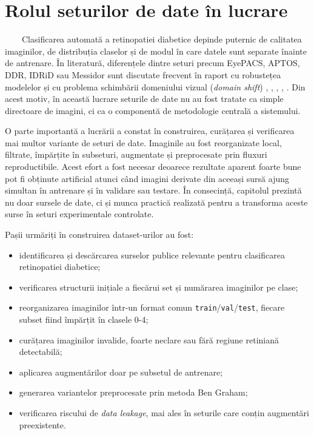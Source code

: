 \documentclass[12pt, a4paper, twoside, romanian]{teza-upb}
\begin{document}
\section{Rolul seturilor de date în lucrare}

\ \ \ \ Clasificarea automată a retinopatiei diabetice depinde puternic de calitatea imaginilor,
de distribuția claselor și de modul în care datele sunt separate înainte de antrenare. În
literatură, diferențele dintre seturi precum EyePACS, APTOS, DDR, IDRiD sau Messidor sunt
discutate frecvent în raport cu robustețea modelelor și cu problema schimbării domeniului
vizual (\textit{domain shift}) \cite{3_gulshan2016development}, \cite{8_zhang2022multi},
\cite{9_chetoui2020explainable}, \cite{14_liu2022deepdrid}, \cite{15_li2019diagnostic}.
Din acest motiv, în această lucrare seturile de date nu au fost tratate ca simple directoare
de imagini, ci ca o componentă de metodologie centrală a sistemului.
\bigskip

O parte importantă a lucrării a constat în construirea, curățarea și verificarea mai multor
variante de seturi de date. Imaginile au fost reorganizate local, filtrate, împărțite în subseturi,
augmentate și preprocesate prin fluxuri reproductibile. Acest efort a fost necesar deoarece
rezultate aparent foarte bune pot fi obținute artificial atunci când imagini derivate din
aceeași sursă ajung simultan în antrenare și în validare sau testare. În consecință, capitolul
prezintă nu doar sursele de date, ci și munca practică realizată pentru a transforma aceste
surse în seturi experimentale controlate.
\bigskip

Pașii urmăriți în construirea dataset-urilor au fost:

\begin{itemize}
  \item identificarea și descărcarea surselor publice relevante pentru clasificarea retinopatiei diabetice;
  \item verificarea structurii inițiale a fiecărui set și numărarea imaginilor pe clase;
  \item reorganizarea imaginilor într-un format comun \texttt{train}/\texttt{val}/\texttt{test}, fiecare subset fiind împărțit în clasele 0-4;
  \item curățarea imaginilor invalide, foarte neclare sau fără regiune retiniană detectabilă;
  \item aplicarea augmentărilor doar pe subsetul de antrenare;
  \item generarea variantelor preprocesate prin metoda Ben Graham;
  \item verificarea riscului de \textit{data leakage}, mai ales în seturile care conțin augmentări preexistente. 
\end{itemize}
\bigskip
\end{document}
